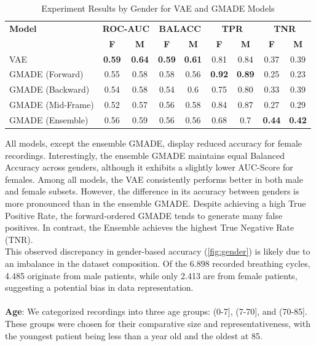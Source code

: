 \begin{table}[h!]
    \centering
    \caption{Experiment Results by Gender for VAE and GMADE Models}
    \begin{tabular}{|l||c|c||c|c||c|c||c|c|}
    \hline
    \textbf{Model} & \multicolumn{2}{c||}{\textbf{ROC-AUC}} & \multicolumn{2}{c||}{\textbf{BALACC}} & \multicolumn{2}{c||}{\textbf{TPR}} & \multicolumn{2}{c|}{\textbf{TNR}} \\
    \cline{2-9}
    & \textbf{F} & \textbf{M} & \textbf{F} & \textbf{M} & \textbf{F} & \textbf{M} & \textbf{F} & \textbf{M} \\
    \hline
    VAE & \textbf{0.59} & \textbf{0.64} & \textbf{0.59} & \textbf{0.61} & 0.81 & 0.84 & 0.37 & 0.39 \\
    GMADE (Forward) & 0.55 & 0.58 & 0.58 & 0.56 & \textbf{0.92} & \textbf{0.89} & 0.25 & 0.23 \\
    GMADE (Backward) & 0.54 & 0.58 & 0.54 & 0.6 & 0.75 & 0.80 & 0.33 & 0.39 \\
    GMADE (Mid-Frame) & 0.52 & 0.57 & 0.56 & 0.58 & 0.84 & 0.87 & 0.27 & 0.29 \\
    GMADE (Ensemble) & 0.56 & 0.59 & 0.56 & 0.56 & 0.68 & 0.7 & \textbf{0.44} & \textbf{0.42} \\
    \hline
    \end{tabular}
    \label{fig:gender}
\end{table}
All models, except the ensemble GMADE, display reduced accuracy for female recordings. Interestingly, the ensemble GMADE maintains equal Balanced Accuracy across genders, although it exhibits a slightly lower AUC-Score for females. Among all models, the VAE consistently performs better in both male and female subsets. However, the difference in its accuracy between genders is more pronounced than in the ensemble GMADE. Despite achieving a high True Positive Rate, the forward-ordered GMADE tends to generate many false positives. In contrast, the Ensemble achieves the highest True Negative Rate (TNR).\\
This observed discrepancy in gender-based accuracy (\autoref{fig:gender}) is likely due to an imbalance in the dataset composition. Of the 6.898 recorded breathing cycles, 4.485 originate from male patients, while only 2.413 are from female patients, suggesting a potential bias in data representation.\\\\
\textbf{Age}: We categorized recordings into three age groups: (0-7], (7-70], and (70-85]. These groups were chosen for their comparative size and representativeness, with the youngest patient being less than a year old and the oldest at 85.

